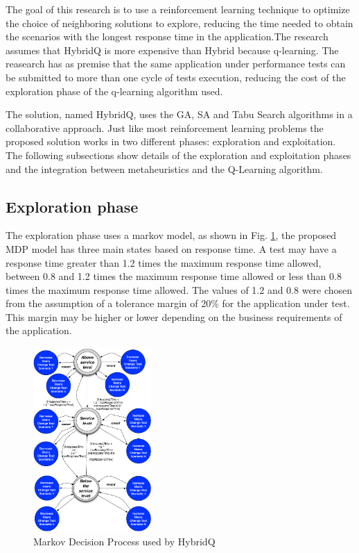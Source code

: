\documentclass{report}
\begin{document}
The goal of this research is to use a reinforcement learning technique to optimize the choice of neighboring solutions to explore, reducing the time needed to obtain the scenarios with the longest response time in the application.The research assumes that HybridQ is more expensive than Hybrid because q-learning. The reasearch has as premise that the same application under performance tests can be submitted to more than one cycle of tests execution, reducing the cost of the exploration phase of the q-learning algorithm used. 


The solution, named HybridQ, uses the GA, SA and Tabu Search algorithms in a collaborative approach. Just like most reinforcement learning problems the proposed solution works in two different phases: exploration and exploitation. The following subsections show details of the exploration and exploitation phases and the integration between metaheuristics and the Q-Learning algorithm.


\subsection{Exploration phase}

The exploration phase uses a markov model, as shown in Fig. \ref{fig:mdphybridq}, the proposed MDP model  has three main states based on response time. A test may have a response time greater than 1.2 times the maximum response time allowed, between 0.8 and 1.2 times the maximum response time allowed or less than 0.8 times the maximum response time allowed. The values of 1.2 and 0.8 were chosen from the assumption of a tolerance margin of 20\% for the application under test. This margin may be higher or lower depending on the business requirements of the application.

\begin{figure}[h!]
\center
\includegraphics[width=0.4\textwidth]{./images/mdp3.png}
\caption{Markov Decision Process used by HybridQ}
\label{fig:mdphybridq}
\end{figure}
\end{document}
